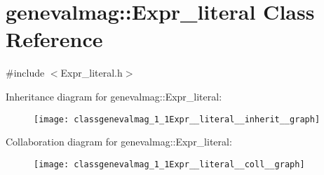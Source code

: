\hypertarget{classgenevalmag_1_1Expr__literal}{
\section{genevalmag::Expr\_\-literal Class Reference}
\label{classgenevalmag_1_1Expr__literal}
}


{\ttfamily \#include $<$Expr\_\-literal.h$>$}



Inheritance diagram for genevalmag::Expr\_\-literal:\nopagebreak
\begin{figure}[H]
\begin{center}
\leavevmode
\texttt{[image: classgenevalmag\_1\_1Expr\_\_literal\_\_inherit\_\_graph]}
\end{center}
\end{figure}


Collaboration diagram for genevalmag::Expr\_\-literal:\nopagebreak
\begin{figure}[H]
\begin{center}
\leavevmode
\texttt{[image: classgenevalmag\_1\_1Expr\_\_literal\_\_coll\_\_graph]}
\end{center}
\end{figure}
